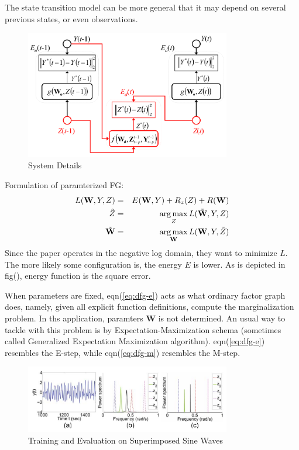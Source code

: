 The state transition model can be more general that it may depend
on several previous states, or even observations. 

\begin{figure}[htb]
\centering
	\includegraphics[width=0.8\textwidth]{fig/mirowski2009-detail.png}
	\caption{System Details}
\end{figure}

Formulation of paramterized FG:
\begin{eqnarray}
	L(\mathbf{W}, Y, Z) &=& E(\mathbf{W}, Y) + R_z(Z) + R(\mathbf{W}) \\
	\tilde{Z} &=& \operatorname*{arg\,max}_{Z} L(\tilde{\mathbf{W}}, Y, Z) \label{eq:dfg-e}\\
	\tilde{\mathbf{W}} &=& \operatorname*{arg\,max}_{\mathbf{W}} L(\mathbf{W}, Y, \tilde{Z})
	\label{eq:dfg-m}
\end{eqnarray}
Since the paper operates in the negative log domain, they want to minimize
$L$. The more likely some configuration is, the energy $E$ is lower. As is 
depicted in fig(), energy function is the square error. 

When parameters are fixed, eqn(\ref{eq:dfg-e}) acts as what ordinary 
factor graph does, namely, given all explicit function definitions, 
compute the marginalization problem. In ths application, paramters $\mathbf{W}$
is not determined. An usual way to tackle with this problem is 
by Expectation-Maximization schema (sometimes called Generalized Expectation 
Maximization algorithm). eqn(\ref{eq:dfg-e}) resembles the E-step, while 
eqn(\ref{eq:dfg-m}) resembles the M-step. 

\begin{figure}[htb]
\centering
	\includegraphics[width=0.8\textwidth]{fig/mirowski2009-sine.png}
	\caption{Training and Evaluation on Superimposed Sine Waves}
\end{figure}

